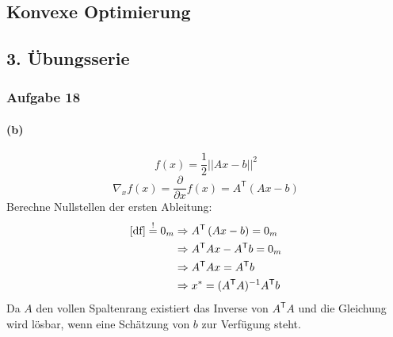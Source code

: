 \documentclass{article}
\newcommand{\tr}{^\mathsf{T}}
\begin{document}
\begin{center}
	\section*{Konvexe Optimierung}
	\subsection*{3. Übungsserie}
\end{center}

\subsubsection*{Aufgabe 18}

\paragraph{(b)}
\begin{equation*}
    f(x)=\frac{1}{2} \vert \vert Ax -b \vert \vert^2
\end{equation*}
\begin{equation}\label{df}
    \nabla_x f(x) = \frac{\partial}{\partial x}f(x)=A\tr \left(Ax -b\right)
\end{equation}
Berechne Nullstellen der ersten Ableitung:
\begin{align*}
    \eqref{df} \overset{!}{=} 0_m &\Rightarrow  A\tr \left(Ax -b\right)= 0_m\\
    &\Rightarrow A\tr Ax - A\tr b = 0_m\\
    &\Rightarrow A\tr Ax  = A\tr b\\
    &\Rightarrow x^*  = (A\tr A)^{-1}A\tr b\\
\end{align*}
Da $A$ den vollen Spaltenrang existiert das Inverse von $A\tr A$ und die Gleichung wird lösbar, wenn eine Schätzung von $b$ zur Verfügung steht.
\end{document}

